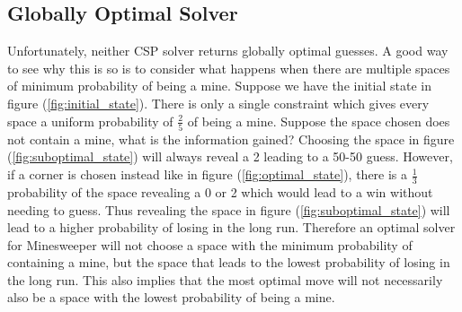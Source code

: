 \documentclass[letterpaper]{article}
\begin{document}
\subsection{Globally Optimal Solver}
Unfortunately, neither CSP solver returns globally optimal guesses.  A good way to see why this is so is to consider what happens when there are multiple spaces of minimum probability of being a mine.  Suppose we have the initial state in figure (\ref{fig:initial_state}).  There is only a single constraint which gives every space a uniform probability of $\frac25$ of being a mine.  Suppose the space chosen does not contain a mine, what is the information gained?  Choosing the space in figure (\ref{fig:suboptimal_state}) will always reveal a 2 leading to a 50-50 guess.  However, if a corner is chosen instead like in figure (\ref{fig:optimal_state}), there is a $\frac13$ probability of the space revealing a 0 or 2 which would lead to a win without needing to guess.  Thus revealing the space in figure (\ref{fig:suboptimal_state}) will lead to a higher probability of losing in the long run.  Therefore an optimal solver for Minesweeper will not choose a space with the minimum probability of containing a mine, but the space that leads to the lowest probability of losing in the long run.  This also implies that the most optimal move will not necessarily also be a space with the lowest probability of being a mine.
\end{document}
